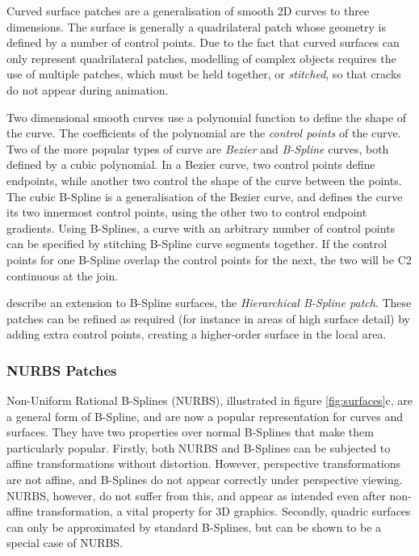 Curved surface patches are a generalisation of smooth 2D curves to three dimensions. The surface is generally a quadrilateral patch whose geometry is defined by a number of control points. Due to the fact that curved surfaces can only represent quadrilateral patches, modelling of complex objects requires the use of multiple patches, which must be held together, or {\it stitched}, so that cracks do not appear during animation.

Two dimensional smooth curves use a polynomial function to define the shape of the curve. The coefficients of the polynomial are the {\it control points} of the curve. Two of the more popular types of curve are {\it Bezier} and {\it B-Spline} curves, both defined by a cubic polynomial. In a Bezier curve, two control points define endpoints, while another two control the shape of the curve between the points. The cubic B-Spline is a generalisation of the Bezier curve, and defines the curve its two innermost control points, using the other two to control endpoint gradients. Using B-Splines, a curve with an arbitrary number of control points can be specified by stitching B-Spline curve segments together. If the control points for one B-Spline overlap the control points for the next, the two will be C2 continuous at the join.

\citet{Forsey88} describe an extension to B-Spline surfaces, the {\it Hierarchical B-Spline patch}. These patches can be refined as required (for instance in areas of high surface detail) by adding extra control points, creating a higher-order surface in the local area.

\subsubsection{\label{sec:litreview:surfaces:smooth:nurbs}NURBS Patches}

Non-Uniform Rational B-Splines (NURBS), illustrated in figure \ref{fig:surfaces}c, are a general form of B-Spline, and are now a popular representation for curves and surfaces. They have two properties over normal B-Splines that make them particularly popular. Firstly, both NURBS and B-Splines can be subjected to affine transformations without distortion. However, perspective transformations are not affine, and B-Splines do not appear correctly under perspective viewing. NURBS, however, do not suffer from this, and appear as intended even after non-affine transformation, a vital property for 3D graphics. Secondly, quadric surfaces can only be approximated by standard B-Splines, but can be shown to be a special case of NURBS.


